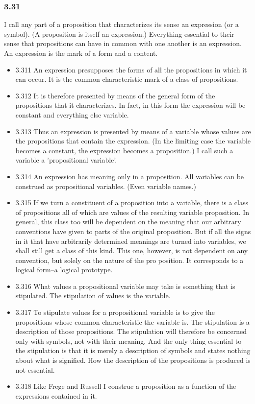 \documentclass[11pt]{article}
\begin{document}
\subsubsection*{3.31}
\label{sec:orgf8e7cdf}
I call any part of a proposition that characterizes its sense an
expression (or a symbol). (A proposition is itself an expression.)
Everything essential to their sense that propositions can have in common
with one another is an expression. An expression is the mark of a form and
a content.
\begin{itemize}
\item 3.311
\label{sec:orgbed3a7f}
An expression presupposes the forms of all the propositions in which
it can occur. It is the common characteristic mark of a class of
propositions.
\item 3.312
\label{sec:org6add7e7}
It is therefore presented by means of the general form of the
propositions that it characterizes. In fact, in this form the expression
will be constant and everything else variable.
\item 3.313
\label{sec:org5c83d63}
Thus an expression is presented by means of a variable whose values
are the propositions that contain the expression. (In the limiting case the
variable becomes a constant, the expression becomes a proposition.) I call
such a variable a 'propositional variable'.
\item 3.314
\label{sec:org2f38a6e}
An expression has meaning only in a proposition. All variables can be
construed as propositional variables. (Even variable names.)
\item 3.315
\label{sec:org41b7d76}
If we turn a constituent of a proposition into a variable, there is a
class of propositions all of which are values of the resulting variable
proposition. In general, this class too will be dependent on the meaning
that our arbitrary conventions have given to parts of the original
proposition. But if all the signs in it that have arbitrarily determined
meanings are turned into variables, we shall still get a class of this
kind. This one, however, is not dependent on any convention, but solely on
the nature of the pro position. It corresponds to a logical form--a logical
prototype.
\item 3.316
\label{sec:org32b174c}
What values a propositional variable may take is something that is
stipulated. The stipulation of values is the variable.
\item 3.317
\label{sec:orgfa84d61}
To stipulate values for a propositional variable is to give the
propositions whose common characteristic the variable is. The stipulation
is a description of those propositions. The stipulation will therefore be
concerned only with symbols, not with their meaning. And the only thing
essential to the stipulation is that it is merely a description of symbols
and states nothing about what is signified. How the description of the
propositions is produced is not essential.
\item 3.318
\label{sec:org869f15f}
Like Frege and Russell I construe a proposition as a function of the
expressions contained in it.
\end{itemize}
\end{document}
